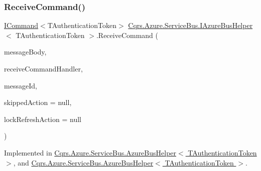 \subsubsection{\texorpdfstring{Receive\+Command()}{ReceiveCommand()}}
{\footnotesize\ttfamily \hyperlink{interfaceCqrs_1_1Commands_1_1ICommand}{I\+Command}$<$T\+Authentication\+Token$>$ \hyperlink{interfaceCqrs_1_1Azure_1_1ServiceBus_1_1IAzureBusHelper}{Cqrs.\+Azure.\+Service\+Bus.\+I\+Azure\+Bus\+Helper}$<$ T\+Authentication\+Token $>$.Receive\+Command (\begin{DoxyParamCaption}\item[{string}]{message\+Body,  }\item[{Func$<$ \hyperlink{interfaceCqrs_1_1Commands_1_1ICommand}{I\+Command}$<$ T\+Authentication\+Token $>$, bool?$>$}]{receive\+Command\+Handler,  }\item[{string}]{message\+Id,  }\item[{Action}]{skipped\+Action = {\ttfamily null},  }\item[{Action}]{lock\+Refresh\+Action = {\ttfamily null} }\end{DoxyParamCaption})}



Implemented in \hyperlink{classCqrs_1_1Azure_1_1ServiceBus_1_1AzureBusHelper_a8aaa5e94b5928cac567f78b351213498_a8aaa5e94b5928cac567f78b351213498}{Cqrs.\+Azure.\+Service\+Bus.\+Azure\+Bus\+Helper$<$ T\+Authentication\+Token $>$}, and \hyperlink{classCqrs_1_1Azure_1_1ServiceBus_1_1AzureBusHelper_a8aaa5e94b5928cac567f78b351213498_a8aaa5e94b5928cac567f78b351213498}{Cqrs.\+Azure.\+Service\+Bus.\+Azure\+Bus\+Helper$<$ T\+Authentication\+Token $>$}.

\mbox{\label{interfaceCqrs_1_1Azure_1_1ServiceBus_1_1IAzureBusHelper_a435d1d63e37ea149087f254f4b73b94a_a435d1d63e37ea149087f254f4b73b94a}} 
